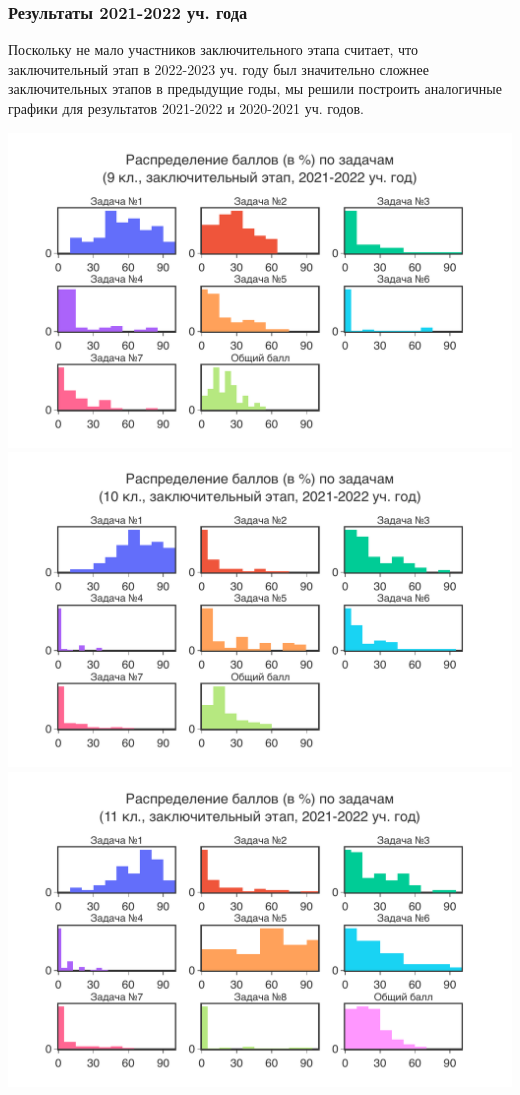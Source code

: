 \subsubsection{Результаты 2021-2022 уч. года}

Поскольку не мало участников заключительного этапа считает, что заключительный этап в 2022-2023 уч. году был значительно сложнее заключительных этапов в предыдущие годы, мы решили построить аналогичные графики для результатов 2021-2022 и 2020-2021 уч. годов.

\includegraphics[width=\linewidth]{../export/pdf/results/2022/respa/grade9-dist-problemwise.pdf}
\includegraphics[width=\linewidth]{../export/pdf/results/2022/respa/grade10-dist-problemwise.pdf}
\includegraphics[width=\linewidth]{../export/pdf/results/2022/respa/grade11-dist-problemwise.pdf}


